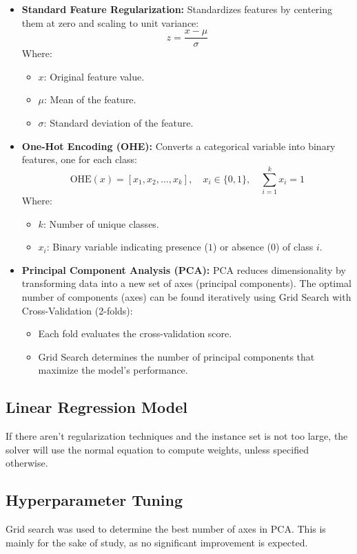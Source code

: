 \documentclass{article}
\begin{document}
\begin{itemize}
    \item \textbf{Standard Feature Regularization:} Standardizes features by centering them at zero and scaling to unit variance:
    \[
    z = \frac{x - \mu}{\sigma}
    \]
    Where:
    \begin{itemize}
        \item \( x \): Original feature value.
        \item \( \mu \): Mean of the feature.
        \item \( \sigma \): Standard deviation of the feature.
    \end{itemize}

    \item \textbf{One-Hot Encoding (OHE):} Converts a categorical variable into binary features, one for each class:
    \[
    \text{OHE}(x) = [x_1, x_2, \dots, x_k], \quad x_i \in \{0, 1\}, \quad \sum_{i=1}^k x_i = 1
    \]
    Where:
    \begin{itemize}
        \item \( k \): Number of unique classes.
        \item \( x_i \): Binary variable indicating presence (\( 1 \)) or absence (\( 0 \)) of class \( i \).
    \end{itemize}

    \item \textbf{Principal Component Analysis (PCA):} PCA reduces dimensionality by transforming data into a new set of axes (principal components). The optimal number of components (axes) can be found iteratively using Grid Search with Cross-Validation (2-folds):
    \begin{itemize}
        \item Each fold evaluates the cross-validation score.
        \item Grid Search determines the number of principal components that maximize the model's performance.
    \end{itemize}
\end{itemize}

\subsection{Linear Regression Model}
If there aren't regularization techniques and the instance set is not too large, the solver will use the normal equation to compute weights, unless specified otherwise.

\subsection{Hyperparameter Tuning}
Grid search was used to determine the best number of axes in PCA. This is mainly for the sake of study, as no significant improvement is expected.
\end{document}
